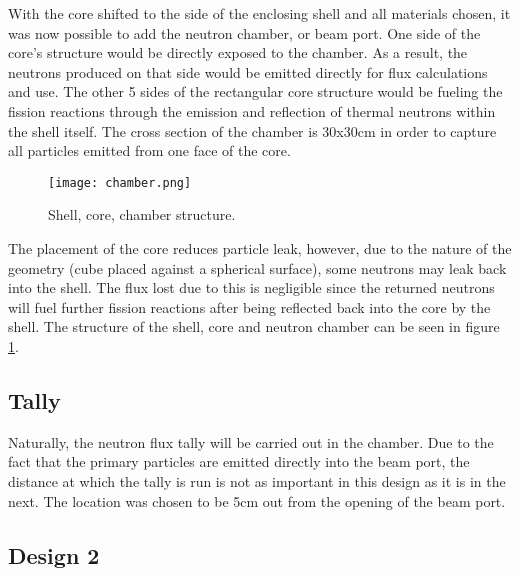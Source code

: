 With the core shifted to the side of the enclosing shell and all materials chosen, it was now possible to add the neutron chamber, or beam port. One side of the core's structure would be directly exposed to the chamber. As a result, the neutrons produced on that side would be emitted directly for flux calculations and use. The other 5 sides of the rectangular core structure would be fueling the fission reactions through the emission and reflection of thermal neutrons within the shell itself. The cross section of the chamber is 30x30cm in order to capture all particles emitted from one face of the core.

\begin{figure}[!htbp]
\caption{Shell, core, chamber structure.}
\label{fig:chamber}
\centering
\texttt{[image: chamber.png]}
\end{figure}

The placement of the core reduces particle leak, however, due to the nature of the geometry (cube placed against a spherical surface), some neutrons may leak back into the shell. The flux lost due to this is negligible since the returned neutrons will fuel further fission reactions after being reflected back into the core by the shell. The structure of the shell, core and neutron chamber can be seen in figure \ref{fig:chamber}. 

\subsection{Tally}

Naturally, the neutron flux tally will be carried out in the chamber. Due to the fact that the primary particles are emitted directly into the beam port, the distance at which the tally is run is not as important in this design as it is in the next. The location was chosen to be 5cm out from the opening of the beam port.

\subsection{Design 2}




